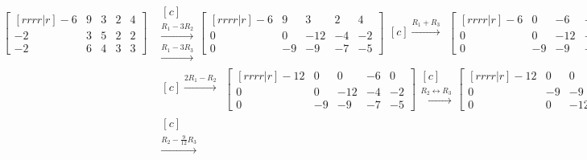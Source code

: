 \documentclass[a4paper,11pt]{article}
\begin{document}
\begin{align*}
\begin{bmatrix}[rrrr|r]
  -6 &  9 &  3 &  2 &  4 \\
  -2 &  3 &  5 &  2 &  2 \\
  -2 &  6 &  4 &  3 &  3
\end{bmatrix}
& \begin{matrix}[c] ~ \\ \xrightarrow{R_1-3R_2} \\ \xrightarrow{R_1-3R_3} \end{matrix}
\begin{bmatrix}[rrrr|r]
  -6 &   9 &   3 &   2 &   4 \\
   0 &   0 & -12 &  -4 &  -2 \\
   0 &  -9 &  -9 &  -7 &  -5
\end{bmatrix}
\begin{matrix}[c] \xrightarrow{R_1+R_3} \\ ~ \\ ~ \end{matrix}
\begin{bmatrix}[rrrr|r]
  -6 &   0 &  -6 &  -5 &  -1 \\
   0 &   0 & -12 &  -4 &  -2 \\
   0 &  -9 &  -9 &  -7 &  -5
\end{bmatrix}
\\
& \begin{matrix}[c] \xrightarrow{2R_1-R_2} \\ ~ \\ ~ \end{matrix}
\begin{bmatrix}[rrrr|r]
 -12 &   0 &   0 &  -6 &   0 \\
   0 &   0 & -12 &  -4 &  -2 \\
   0 &  -9 &  -9 &  -7 &  -5
\end{bmatrix}
\begin{matrix}[c] ~ \\ \xrightarrow{R_2 \leftrightarrow R_3} \\ ~ \end{matrix}
\begin{bmatrix}[rrrr|r]
 -12 &   0 &   0 &  -6 &   0 \\
   0 &  -9 &  -9 &  -7 &  -5 \\
   0 &   0 & -12 &  -4 &  -2
\end{bmatrix}
\\
& \begin{matrix}[c] ~ \\ \xrightarrow{R_2-\frac{9}{12}R_3} \\ ~ \end{matrix}

\end{align*}
\end{document}
